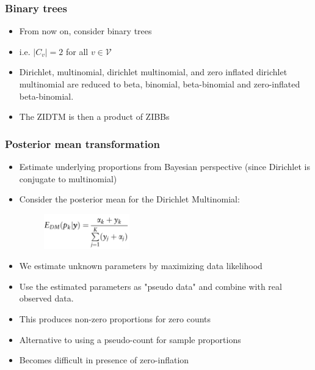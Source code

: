 \documentclass{beamer}
\begin{document}
\begin{frame}
\frametitle{Binary trees }
\begin{itemize}
     \item From now on, consider binary trees
     \item i.e. $|C_v| = 2$ for all $v \in \mathcal{V}$
     \item Dirichlet, multinomial, dirichlet multinomial, and zero inflated dirichlet multinomial are reduced to beta, binomial, beta-binomial and zero-inflated beta-binomial.
     \item The ZIDTM is then a product of ZIBBs
\end{itemize}
\end{frame}


\begin{frame}
 \frametitle{Posterior mean transformation}
 \begin{itemize}
   \item Estimate underlying proportions from Bayesian perspective (since Dirichlet is conjugate to multinomial)
   \item Consider the posterior mean for the Dirichlet Multinomial:
   \begin{figure}[!htb]
 	\centering
 	\includegraphics[width=0.35\textwidth]{img/edm.png}
 \end{figure}
 \item We estimate unknown parameters by maximizing data likelihood
 \item Use the estimated parameters as "pseudo data" and combine with real observed data.
 \item This produces non-zero proportions for zero counts
 \item Alternative to using a pseudo-count for sample proportions
 \item Becomes difficult in presence of zero-inflation
 \end{itemize}

\end{frame}
\end{document}
